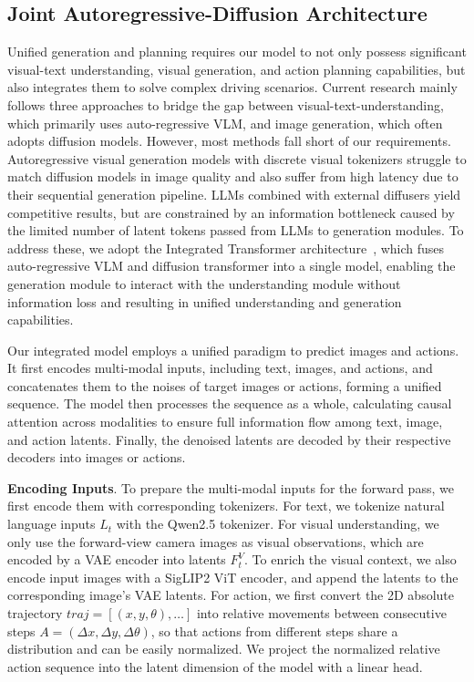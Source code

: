 \subsection{Joint Autoregressive-Diffusion Architecture}
\label{sec: method_model}
Unified generation and planning requires our model to not only possess significant visual-text understanding, visual generation, and action planning capabilities, but also integrates them to solve complex driving scenarios. 
Current research mainly follows three approaches to bridge the gap between visual-text-understanding, which primarily uses auto-regressive VLM, and image generation, which often adopts diffusion models. 
However, most methods fall short of our requirements. 
Autoregressive visual generation models with discrete visual tokenizers struggle to match diffusion models in image quality and also suffer from high latency due to their sequential generation pipeline. 
LLMs combined with external diffusers yield competitive results, but are constrained by an information bottleneck caused by the limited number of latent tokens passed from LLMs to generation modules. 
To address these, we adopt the Integrated Transformer architecture~\cite{bagel}, which fuses auto-regressive VLM and diffusion transformer into a single model, enabling the generation module to interact with the understanding module without information loss and resulting in unified understanding and generation capabilities. 

Our integrated model employs a unified paradigm to predict images and actions. It first encodes multi-modal inputs, including text, images, and actions, and concatenates them to the noises of target images or actions, forming a unified sequence. 
The model then processes the sequence as a whole, calculating causal attention across modalities to ensure full information flow among text, image, and action latents. 
Finally, the denoised latents are decoded by their respective decoders into images or actions. 
 
\textbf{Encoding Inputs}. 
To prepare the multi-modal inputs for the forward pass, we first encode them with corresponding tokenizers. For text, we tokenize natural language inputs $L_t$ with the Qwen2.5 tokenizer. For visual understanding, we only use the forward-view camera images as visual observations, which are encoded by a VAE encoder into latents $F_t^V$. To enrich the visual context, we also encode input images with a SigLIP2 ViT encoder, and append the latents to the corresponding image's VAE latents. For action, we first convert the 2D absolute trajectory $traj=[(x, y, \theta), \dots]$ into relative movements between consecutive steps $A=(\Delta x, \Delta y, \Delta \theta)$, so that actions from different steps share a distribution and can be easily normalized. We project the normalized relative action sequence into the latent dimension of the model with a linear head. 


